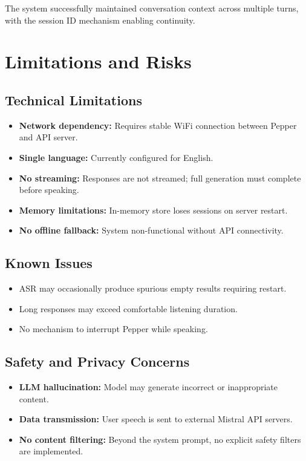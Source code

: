 \documentclass[a4paper]{article}
\begin{document}
The system successfully maintained conversation context across multiple turns, with the session ID mechanism enabling continuity.

\section{Limitations and Risks}

\subsection{Technical Limitations}

\begin{itemize}[noitemsep]
    \item \textbf{Network dependency:} Requires stable WiFi connection between Pepper and API server.
    \item \textbf{Single language:} Currently configured for English.
    \item \textbf{No streaming:} Responses are not streamed; full generation must complete before speaking.
    \item \textbf{Memory limitations:} In-memory store loses sessions on server restart.
    \item \textbf{No offline fallback:} System non-functional without API connectivity.
\end{itemize}

\subsection{Known Issues}

\begin{itemize}[noitemsep]
    \item ASR may occasionally produce spurious empty results requiring restart.
    \item Long responses may exceed comfortable listening duration.
    \item No mechanism to interrupt Pepper while speaking.
\end{itemize}

\subsection{Safety and Privacy Concerns}

\begin{itemize}[noitemsep]
    \item \textbf{LLM hallucination:} Model may generate incorrect or inappropriate content.
    \item \textbf{Data transmission:} User speech is sent to external Mistral API servers.
    \item \textbf{No content filtering:} Beyond the system prompt, no explicit safety filters are implemented.
\end{itemize}
\end{document}
